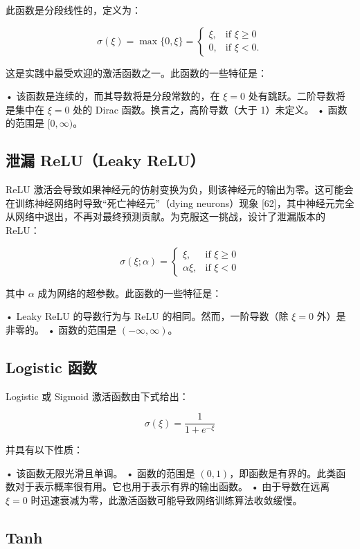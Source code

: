 此函数是分段线性的，定义为：

\[
\sigma(\xi) = \max\{0, \xi\} = 
\begin{cases} 
\xi, & \text{if } \xi \geq 0 \\ 
0, & \text{if } \xi < 0.
\end{cases}
\]

这是实践中最受欢迎的激活函数之一。此函数的一些特征是：

• 该函数是连续的，而其导数将是分段常数的，在 $\xi=0$ 处有跳跃。二阶导数将是集中在 $\xi=0$ 处的 Dirac 函数。换言之，高阶导数（大于 1）未定义。
• 函数的范围是 $[0, \infty)$。

\subsection{泄漏 ReLU（Leaky ReLU）}

ReLU 激活会导致如果神经元的仿射变换为负，则该神经元的输出为零。这可能会在训练神经网络时导致“死亡神经元”（dying neurons）现象 [62]，其中神经元完全从网络中退出，不再对最终预测贡献。为克服这一挑战，设计了泄漏版本的 ReLU：

\[
\sigma(\xi; \alpha) = 
\begin{cases} 
\xi, & \text{if } \xi \geq 0 \\ 
\alpha \xi, & \text{if } \xi < 0
\end{cases}
\]

其中 $\alpha$ 成为网络的超参数。此函数的一些特征是：

• Leaky ReLU 的导数行为与 ReLU 的相同。然而，一阶导数（除 $\xi=0$ 外）是非零的。
• 函数的范围是 $(-\infty, \infty)$。

\subsection{Logistic 函数}

Logistic 或 Sigmoid 激活函数由下式给出：

\[
\sigma(\xi) = \frac{1}{1 + e^{-\xi}}
\]

并具有以下性质：

• 该函数无限光滑且单调。
• 函数的范围是 $(0,1)$，即函数是有界的。此类函数对于表示概率很有用。它也用于表示有界的输出函数。
• 由于导数在远离 $\xi=0$ 时迅速衰减为零，此激活函数可能导致网络训练算法收敛缓慢。

\subsection{Tanh}

